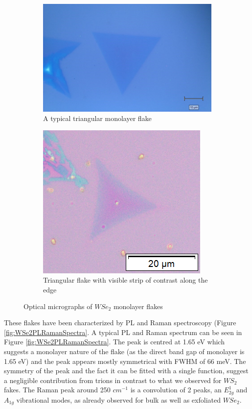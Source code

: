 \begin{figure}[!h]
\begin{center}
	\begin{subfigure}[b]{0.4\textwidth}
		\includegraphics[scale=0.35]{WSe2/OMMap.png}
		\caption{A typical triangular monolayer flake}
		\label{fig:WSe2OMMap}
	\end{subfigure}
	\qquad
	\begin{subfigure}[b]{0.4\textwidth}
		\includegraphics[scale=0.5]{WSe2/OMMap2.png}
		\caption{Triangular flake with visible strip of contrast along the edge}
		\label{fig:WSe2OMMap2}
	\end{subfigure}
	\caption{Optical micrographs of $WSe_2$ monolayer flakes}
\end{center}
\end{figure}

These flakes have been characterized by PL and Raman spectroscopy (Figure \ref{fig:WSe2PLRamanSpectra}. A typical PL and Raman spectrum can be seen in Figure \ref{fig:WSe2PLRamanSpectra}. The peak is centred at 1.65 eV which suggests a monolayer nature of the flake (as the direct band gap of monolayer is 1.65 eV) and the peak appears mostly symmetrical with FWHM of 66 meV. The symmetry of the peak and the fact it can be fitted with a single function, suggest a negligible contribution from trions in contrast to what we observed for $WS_2$  fakes. The Raman peak around 250 $cm^{-1}$ is a convolution of 2 peaks, an $E^1_{2g}$ and $A_{1g}$ vibrational modes, as already observed for bulk as well as exfoliated $WSe_2$.

